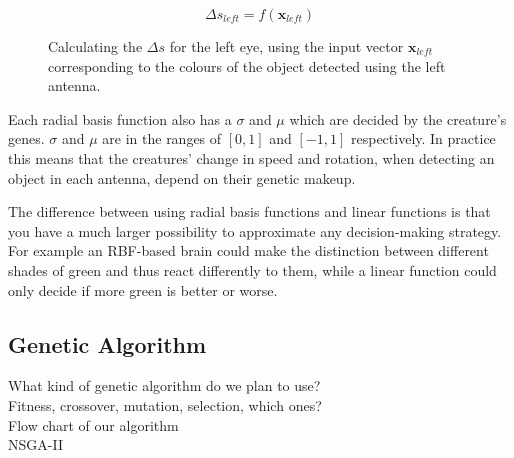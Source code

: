 \documentclass[a4paper,11pt]{kth-mag}
\begin{document}
\begin{figure}
\begin{equation}
\Delta s _{left} = f(\mathbf{x} _{left})
\end{equation}
\caption{Calculating the $\Delta s$ for the left eye, using the input vector $\mathbf{x} _{left}$ corresponding to the colours of the object detected using the left antenna.\label{RBF_decide}}
\end{figure}

Each radial basis function also has a $\sigma$ and $\mu$ which are decided by the creature's genes. $\sigma$ and $\mu$ are in the ranges of $[0,1]$ and $[-1,1]$ respectively. In practice this means that the creatures' change in speed and rotation, when detecting an object in each antenna, depend on their genetic makeup.

The difference between using radial basis functions and linear functions is that you have a much larger possibility to approximate any decision-making strategy. For example an RBF-based brain could make the distinction between different shades of green and thus react differently to them, while a linear function could only decide if more green is better or worse.

\subsection{Genetic Algorithm}
What kind of genetic algorithm do we plan to use?\\
Fitness, crossover, mutation, selection, which ones?\\
Flow chart of our algorithm\\
NSGA-II\\
\end{document}
